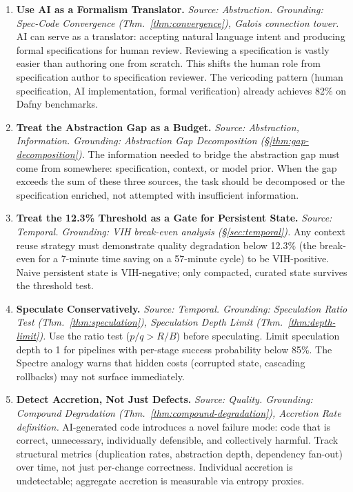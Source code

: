 \documentclass[11pt, a4paper]{googledeepmind}
\begin{document}
\begin{enumerate}[label=\textbf{P\arabic*.}, leftmargin=3em, resume]

\item \textbf{Use AI as a Formalism Translator.}
\emph{Source: Abstraction. Grounding: Spec-Code Convergence (Thm.~\ref{thm:convergence}), Galois connection tower.}
AI can serve as a translator: accepting natural language intent and producing formal specifications for human review. Reviewing a specification is vastly easier than authoring one from scratch. This shifts the human role from specification author to specification reviewer. The vericoding pattern (human specification, AI implementation, formal verification) already achieves 82\% on Dafny benchmarks.

\item \textbf{Treat the Abstraction Gap as a Budget.}
\emph{Source: Abstraction, Information. Grounding: Abstraction Gap Decomposition (\S\ref{thm:gap-decomposition}).}
The information needed to bridge the abstraction gap must come from somewhere: specification, context, or model prior. When the gap exceeds the sum of these three sources, the task should be decomposed or the specification enriched, not attempted with insufficient information.

\item \textbf{Treat the 12.3\% Threshold as a Gate for Persistent State.}
\emph{Source: Temporal. Grounding: VIH break-even analysis (\S\ref{sec:temporal}).}
Any context reuse strategy must demonstrate quality degradation below 12.3\% (the break-even for a 7-minute time saving on a 57-minute cycle) to be VIH-positive. Naive persistent state is VIH-negative; only compacted, curated state survives the threshold test.

\item \textbf{Speculate Conservatively.}
\emph{Source: Temporal. Grounding: Speculation Ratio Test (Thm.~\ref{thm:speculation}), Speculation Depth Limit (Thm.~\ref{thm:depth-limit}).}
Use the ratio test ($p/q > R/B$) before speculating. Limit speculation depth to 1 for pipelines with per-stage success probability below 85\%. The Spectre analogy warns that hidden costs (corrupted state, cascading rollbacks) may not surface immediately.

\item \textbf{Detect Accretion, Not Just Defects.}
\emph{Source: Quality. Grounding: Compound Degradation (Thm.~\ref{thm:compound-degradation}), Accretion Rate definition.}
AI-generated code introduces a novel failure mode: code that is correct, unnecessary, individually defensible, and collectively harmful. Track structural metrics (duplication rates, abstraction depth, dependency fan-out) over time, not just per-change correctness. Individual accretion is undetectable; aggregate accretion is measurable via entropy proxies.


\end{enumerate}
\end{document}
